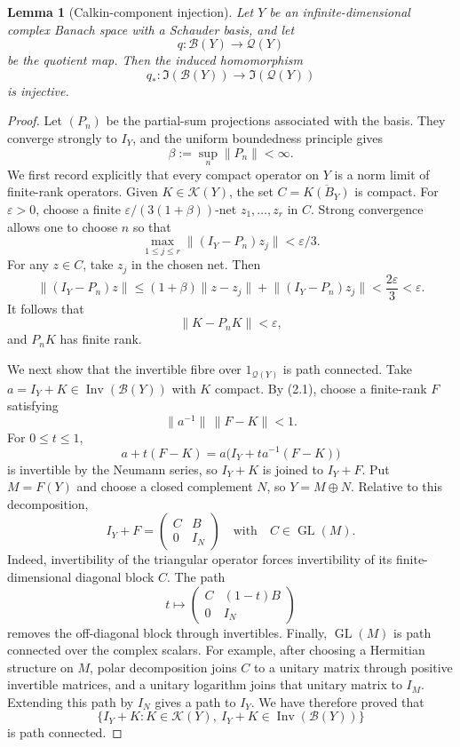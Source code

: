 \documentclass[11pt]{article}
\newtheorem{lemma}[theorem]{Lemma}
\theoremstyle{remark}
\newcommand{\B}{\mathcal B}
\newcommand{\K}{\mathcal K}
\newcommand{\Q}{\mathcal Q}
\newcommand{\Inv}{\operatorname{Inv}}
\newcommand{\GL}{\operatorname{GL}}
\newcommand{\Id}{\mathfrak I}
\begin{document}
\begin{lemma}[Calkin-component injection]\label{lem:injection}
Let $Y$ be an infinite-dimensional complex Banach space with a Schauder basis,
and let
\[
 q:\B(Y)\longrightarrow\Q(Y)
\]
be the quotient map.  Then the induced homomorphism
\[
 q_*:\Id(\B(Y))\longrightarrow\Id(\Q(Y))
\]
is injective.
\end{lemma}

\begin{proof}
Let $(P_n)$ be the partial-sum projections associated with the basis.  They
converge strongly to $I_Y$, and the uniform boundedness principle gives
\[
  \beta:=\sup_n\lVert P_n\rVert<\infty.
\]
We first record explicitly that every compact operator on $Y$ is a norm limit
of finite-rank operators.  Given $K\in\K(Y)$, the set
\(
C=\overline{K(B_Y)}
\)
is compact.  For $\varepsilon>0$, choose a finite
$\varepsilon/(3(1+\beta))$-net $z_1,\dots,z_r$ in $C$.  Strong convergence
allows one to choose $n$ so that
\[
 \max_{1\le j\le r}\lVert(I_Y-P_n)z_j\rVert<\varepsilon/3.
\]
For any $z\in C$, take $z_j$ in the chosen net.  Then
\[
 \lVert(I_Y-P_n)z\rVert
 \le (1+\beta)\lVert z-z_j\rVert
       +\lVert(I_Y-P_n)z_j\rVert
 <\frac{2\varepsilon}{3}<\varepsilon.
\]
It follows that
\[
 \lVert K-P_nK\rVert<\varepsilon,                       \tag{2.1}
\]
and $P_nK$ has finite rank.

We next show that the invertible fibre over $1_{\Q(Y)}$ is path connected.
Take
\(
a=I_Y+K\in\Inv(\B(Y))
\)
with $K$ compact.  By (2.1), choose a finite-rank $F$ satisfying
\[
 \lVert a^{-1}\rVert\,\lVert F-K\rVert<1.              \tag{2.2}
\]
For $0\le t\le1$,
\[
 a+t(F-K)=a\bigl(I_Y+t a^{-1}(F-K)\bigr)
\]
is invertible by the Neumann series, so $I_Y+K$ is joined to $I_Y+F$.
Put $M=F(Y)$ and choose a closed complement $N$, so $Y=M\oplus N$.  Relative
to this decomposition,
\[
 I_Y+F=
 \begin{pmatrix}C&B\\0&I_N\end{pmatrix}
 \quad\text{with}\quad C\in\GL(M).
\]
Indeed, invertibility of the triangular operator forces invertibility of its
finite-dimensional diagonal block $C$.  The path
\[
 t\longmapsto
 \begin{pmatrix}C&(1-t)B\\0&I_N\end{pmatrix}
\]
removes the off-diagonal block through invertibles.  Finally,
$\GL(M)$ is path connected over the complex scalars.  For example, after
choosing a Hermitian structure on $M$, polar decomposition joins $C$ to a
unitary matrix through positive invertible matrices, and a unitary logarithm
joins that unitary matrix to $I_M$.  Extending this path by $I_N$ gives a path
to $I_Y$.  We have therefore proved that
\[
 \{I_Y+K:K\in\K(Y),\ I_Y+K\in\Inv(\B(Y))\}             \tag{2.3}
\]
is path connected.


\end{proof}
\end{document}
